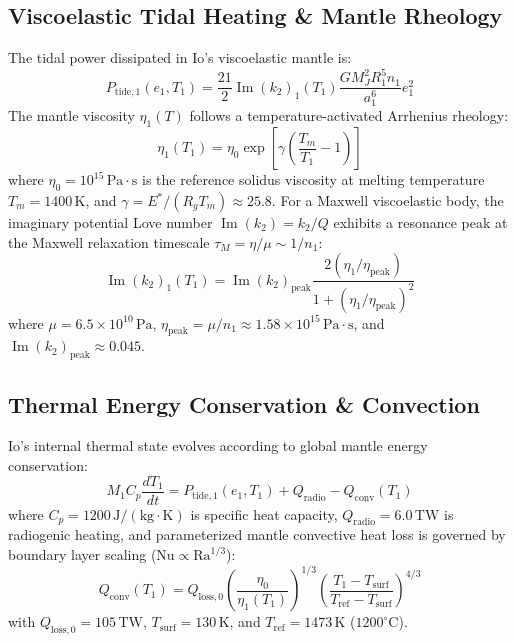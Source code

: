 \documentclass[11pt,a4paper]{article}
\begin{document}
\subsection{Viscoelastic Tidal Heating \& Mantle Rheology}
The tidal power dissipated in Io's viscoelastic mantle is:
\begin{equation}
P_{\mathrm{tide}, 1}(e_1, T_1) = \frac{21}{2} \operatorname{Im}(k_2)_1(T_1) \frac{G M_J^2 R_1^5 n_1}{a_1^6} e_1^2
\label{eq:Ptide}
\end{equation}
The mantle viscosity $\eta_1(T)$ follows a temperature-activated Arrhenius rheology:
\begin{equation}
\eta_1(T_1) = \eta_0 \exp\left[ \gamma \left( \frac{T_m}{T_1} - 1 \right) \right]
\end{equation}
where $\eta_0 = 10^{15}\,\mathrm{Pa\cdot s}$ is the reference solidus viscosity at melting temperature $T_m = 1400\,\mathrm{K}$, and $\gamma = E^* / (R_g T_m) \approx 25.8$. For a Maxwell viscoelastic body, the imaginary potential Love number $\operatorname{Im}(k_2) = k_2 / Q$ exhibits a resonance peak at the Maxwell relaxation timescale $\tau_M = \eta / \mu \sim 1/n_1$:
\begin{equation}
\operatorname{Im}(k_2)_1(T_1) = \operatorname{Im}(k_2)_{\mathrm{peak}} \frac{2 (\eta_1 / \eta_{\mathrm{peak}})}{1 + (\eta_1 / \eta_{\mathrm{peak}})^2}
\end{equation}
where $\mu = 6.5 \times 10^{10}\,\mathrm{Pa}$, $\eta_{\mathrm{peak}} = \mu / n_1 \approx 1.58 \times 10^{15}\,\mathrm{Pa\cdot s}$, and $\operatorname{Im}(k_2)_{\mathrm{peak}} \approx 0.045$.

\subsection{Thermal Energy Conservation \& Convection}
Io's internal thermal state evolves according to global mantle energy conservation:
\begin{equation}
M_1 C_p \frac{dT_1}{dt} = P_{\mathrm{tide}, 1}(e_1, T_1) + Q_{\mathrm{radio}} - Q_{\mathrm{conv}}(T_1)
\label{eq:dT_dt}
\end{equation}
where $C_p = 1200\,\mathrm{J/(kg\cdot K)}$ is specific heat capacity, $Q_{\mathrm{radio}} = 6.0\,\mathrm{TW}$ is radiogenic heating, and parameterized mantle convective heat loss is governed by boundary layer scaling ($\mathrm{Nu} \propto \mathrm{Ra}^{1/3}$):
\begin{equation}
Q_{\mathrm{conv}}(T_1) = Q_{\mathrm{loss}, 0} \left(\frac{\eta_0}{\eta_1(T_1)}\right)^{1/3} \left(\frac{T_1 - T_{\mathrm{surf}}}{T_{\mathrm{ref}} - T_{\mathrm{surf}}}\right)^{4/3}
\end{equation}
with $Q_{\mathrm{loss}, 0} = 105\,\mathrm{TW}$, $T_{\mathrm{surf}} = 130\,\mathrm{K}$, and $T_{\mathrm{ref}} = 1473\,\mathrm{K}$ ($1200^\circ\mathrm{C}$).
\end{document}
